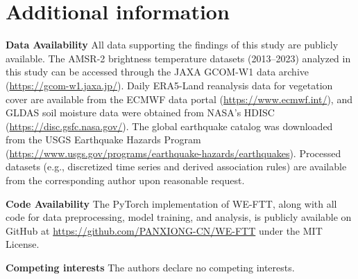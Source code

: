 \documentclass[preprint,review,12pt,authoryear]{elsarticle}
\begin{document}
\section*{Additional information}
\textbf{Data Availability} All data supporting the findings of this study are publicly available. The AMSR-2 brightness temperature datasets (2013--2023) analyzed in this study can be accessed through the JAXA GCOM-W1 data archive (\url{https://gcom-w1.jaxa.jp/}). Daily ERA5-Land reanalysis data for vegetation cover are available from the ECMWF data portal (\url{https://www.ecmwf.int/}), and GLDAS soil moisture data were obtained from NASA's HDISC (\url{https://disc.gsfc.nasa.gov/}). The global earthquake catalog was downloaded from the USGS Earthquake Hazards Program (\url{https://www.usgs.gov/programs/earthquake-hazards/earthquakes}). Processed datasets (e.g., discretized time series and derived association rules) are available from the corresponding author upon reasonable request.

\textbf{Code Availability} The PyTorch implementation of WE-FTT, along with all code for data preprocessing, model training, and analysis, is publicly available on GitHub at \url{https://github.com/PANXIONG-CN/WE-FTT} under the MIT License.

\textbf{Competing interests} The authors declare no competing interests.
\end{document}
